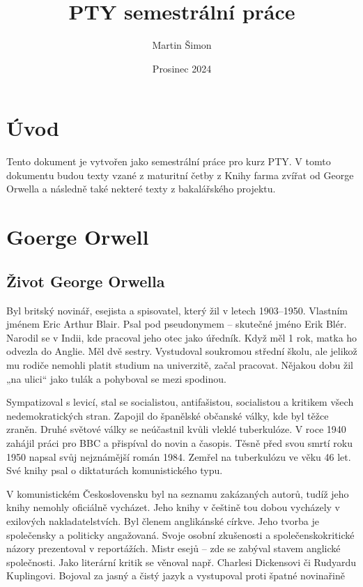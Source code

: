 \documentclass{article}
\title{PTY semestrální práce}
\author{Martin Šimon}
\date{Prosinec 2024}
\begin{document}
\maketitle


\tableofcontents
{} %
\setcounter{page}{2}

\clearpage

\section{Úvod}
Tento dokument je vytvořen jako semestrální práce pro kurz PTY. V tomto dokumentu budou texty vzané z 
maturitní četby z Knihy farma zvířat od George Orwella a následně také nekteré texty z bakalářského projektu.


\section{Goerge Orwell}

\subsection{Život George Orwella}

Byl britský novinář, esejista a spisovatel, který žil v letech 1903–1950. Vlastním jménem Eric Arthur Blair. Psal pod pseudonymem – skutečné jméno Erik Blér. Narodil se v Indii, kde pracoval jeho otec jako úředník. Když měl 1 rok, matka ho odvezla do Anglie. Měl dvě sestry. Vystudoval soukromou střední školu, ale jelikož mu rodiče nemohli platit studium na univerzitě, začal pracovat. Nějakou dobu žil „na ulici“ jako tulák a pohyboval se mezi spodinou. 

Sympatizoval s levicí, stal se socialistou, antifašistou, socialistou a kritikem všech nedemokratických stran. 
Zapojil do španělské občanské války, kde byl těžce zraněn. Druhé světové války se neúčastnil kvůli vleklé 
tuberkulóze. V roce 1940 zahájil práci pro BBC a přispíval do novin a časopis. Těsně před svou smrtí roku 1950 
napsal svůj nejznámější román 1984. Zemřel na tuberkulózu ve věku 46 let. Své knihy psal o diktaturách 
komunistického typu. 

V komunistickém Československu byl na seznamu zakázaných autorů, tudíž jeho knihy nemohly oficiálně vycházet. 
Jeho knihy v češtině tou dobou vycházely v exilových nakladatelstvích. Byl členem anglikánské církve. Jeho 
tvorba je společensky a politicky angažovaná. Svoje osobní zkušenosti a společenskokritické názory prezentoval 
v reportážích. Mistr esejů – zde se zabýval stavem anglické společnosti. Jako literární kritik se věnoval 
např. Charlesi Dickensovi či Rudyardu Kuplingovi. Bojoval za jasný a čistý jazyk a vystupoval proti špatné 
novinařině
\end{document}
